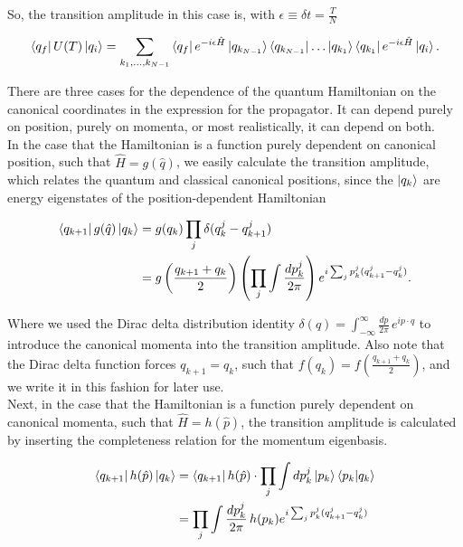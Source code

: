 \noindent So, the transition amplitude in this case is, with $\epsilon \equiv \delta t = \frac{T}{N}$

\begin{equation}
\bra{q_f} U(T) \ket{q_i} = \sum_{k_1,\dots,k_{N-1}} \bra{q_f} e^{-i \epsilon \hat{H}} \ket{q_{k_{N-1}}} \bra{q_{k_{N-1}}} \dots \ket{q_{k_1}}\bra{q_{k_1}} e^{-i \epsilon \hat{H}} \ket{q_i}.
\end{equation}

\noindent There are three cases for the dependence of the quantum Hamiltonian on the canonical coordinates in the expression for the propagator. It can depend purely on position, purely on momenta, or most realistically, it can depend on both. \\

\noindent In the case that the Hamiltonian is a function purely dependent on canonical position, such that $\hat{H} = g(\hat{q})$, we easily calculate the transition amplitude, which relates the quantum and classical canonical positions, since the $\ket{q_k}$ are energy eigenstates of the position-dependent Hamiltonian

\begin{align}
\bra{q_{k+1}} g(\hat{q}) \ket{q_k} &= g(q_k) \prod_j \delta ( q_k^j - q_{k+1}^j ) \\
&= g \left( \frac{q_{k+1} + q_k}{2} \right) \left( \prod_j \int \frac{dp_k^j}{2\pi} \right) e^{ i \sum_j p_k^j (q_{k+1}^j - q_k^j ) }.
\end{align}

\noindent Where we used the Dirac delta distribution identity $\delta (q) = \int_{-\infty}^{\infty} \frac{dp}{2\pi} \, e^{i p \cdot q}$ to introduce the canonical momenta into the transition amplitude. Also note that the Dirac delta function forces $q_{k+1} = q_k$, such that $f(q_k) = f(\frac{q_{k+1} + q_k}{2})$, and we write it in this fashion for later use. \\

\noindent Next, in the case that the Hamiltonian is a function purely dependent on canonical momenta, such that $\hat{H} = h(\hat{p})$, the transition amplitude is calculated by inserting the completeness relation for the momentum eigenbasis.

\begin{align}
\bra{q_{k+1}} h(\hat{p}) \ket{q_k} &= \bra{q_{k+1}} h(\hat{p}) \cdot \prod_j \int dp_k^j \ket{p_k} \braket{p_k | q_k} \\
&= \prod_j \int \frac{dp_k^j}{2\pi} \, h(p_k) e^{ i \sum_j p_k^j (q_{k+1}^j - q_k^j ) }
\end{align}

